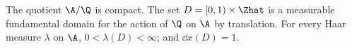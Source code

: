 The quotient $\A/\Q$ is compact. The set $D=[0,1)\times\Zhat$ is a measurable fundamental domain for the action of
$\Q$ on $\A$ by translation. For every Haar measure $\lambda$ on $\A$, $0<\lambda(D)<\infty$; and $\dd x(D)=1$.
